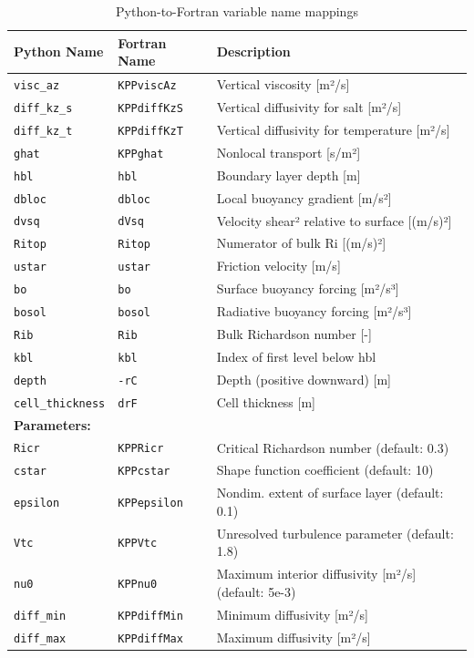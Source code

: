 \documentclass[11pt]{article}
\begin{document}
\begin{table}[h]
\centering
\small
\begin{tabular}{llp{4.5cm}}
\toprule
\textbf{Python Name} & \textbf{Fortran Name} & \textbf{Description} \\
\midrule
\verb|visc_az| & \verb|KPPviscAz| & Vertical viscosity [m²/s] \\
\verb|diff_kz_s| & \verb|KPPdiffKzS| & Vertical diffusivity for salt [m²/s] \\
\verb|diff_kz_t| & \verb|KPPdiffKzT| & Vertical diffusivity for temperature [m²/s] \\
\verb|ghat| & \verb|KPPghat| & Nonlocal transport [s/m²] \\
\verb|hbl| & \verb|hbl| & Boundary layer depth [m] \\
\verb|dbloc| & \verb|dbloc| & Local buoyancy gradient [m/s²] \\
\verb|dvsq| & \verb|dVsq| & Velocity shear² relative to surface [(m/s)²] \\
\verb|Ritop| & \verb|Ritop| & Numerator of bulk Ri [(m/s)²] \\
\verb|ustar| & \verb|ustar| & Friction velocity [m/s] \\
\verb|bo| & \verb|bo| & Surface buoyancy forcing [m²/s³] \\
\verb|bosol| & \verb|bosol| & Radiative buoyancy forcing [m²/s³] \\
\verb|Rib| & \verb|Rib| & Bulk Richardson number [-] \\
\verb|kbl| & \verb|kbl| & Index of first level below hbl \\
\verb|depth| & \verb|-rC| & Depth (positive downward) [m] \\
\verb|cell_thickness| & \verb|drF| & Cell thickness [m] \\
\midrule
\multicolumn{3}{l}{\textbf{Parameters:}} \\
\verb|Ricr| & \verb|KPPRicr| & Critical Richardson number (default: 0.3) \\
\verb|cstar| & \verb|KPPcstar| & Shape function coefficient (default: 10) \\
\verb|epsilon| & \verb|KPPepsilon| & Nondim. extent of surface layer (default: 0.1) \\
\verb|Vtc| & \verb|KPPVtc| & Unresolved turbulence parameter (default: 1.8) \\
\verb|nu0| & \verb|KPPnu0| & Maximum interior diffusivity [m²/s] (default: 5e-3) \\
\verb|diff_min| & \verb|KPPdiffMin| & Minimum diffusivity [m²/s] \\
\verb|diff_max| & \verb|KPPdiffMax| & Maximum diffusivity [m²/s] \\
\bottomrule
\end{tabular}
\caption{Python-to-Fortran variable name mappings}
\end{table}
\end{document}
